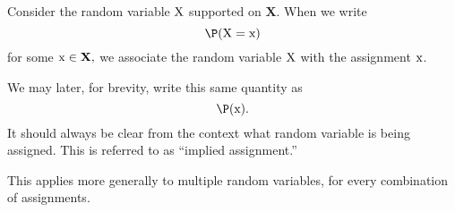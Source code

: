 \begin{note}
  \def\X{{\mathbf X}}
  \def\XV{{\rm X}}
  \def\XX{{\rm x}}
  Consider the random variable $\XV$ supported on $\X$. 
  When we write $$\P(\XV = \XX)$$
  for some $\XX \in \X,$
  we associate the random variable $\XV$ with the assignment $\XX$.

  We may later, for brevity, write this same quantity
  as $$\P(\XX).$$
  It should always be clear from the context what random variable is being assigned.
  This is referred to as ``implied assignment.''

  This applies more generally to multiple random variables,
  for every combination of assignments.
\end{note}
